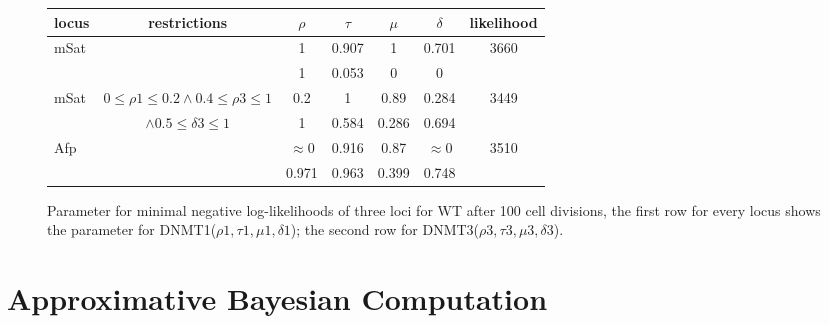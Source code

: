 \begin{figure}[h]
\begin{center}
\begin{tabularx}{\textwidth}{l|c|c|c|c|c|c}
locus&	restrictions&	$\rho$&	$\tau$&	$\mu$&	$\delta$&	likelihood\\
\hline
mSat&	&	1&	0.907&	1&	0.701&	3660\\%
	&	&	1&	0.053&	0&	0&	\\
\hline
mSat&	$0 \leq \rho1 \leq 0.2 \wedge 0.4 \leq \rho3 \leq 1$&	0.2&	1&	0.89&	0.284&	3449\\%
	&	$\wedge 0.5 \leq \delta3 \leq 1$&	1&	0.584&	0.286&	0.694&	\\
\hline
Afp&	&	$\approx0$&	0.916&	0.87&	$\approx0$&	3510\\
	&	&	0.971&	0.963&	0.399&	0.748&	\\
\end{tabularx}
\end{center}
\label{WT33}
\caption{Parameter for minimal negative log-likelihoods of three loci for WT after 100 cell divisions, the first row for every locus shows the parameter for DNMT1($\rho1, \tau1, \mu1, \delta1$); the second row for DNMT3($\rho3, \tau3, \mu3, \delta3$).}
\end{figure}

\section{Approximative Bayesian Computation}
\label{ABC}